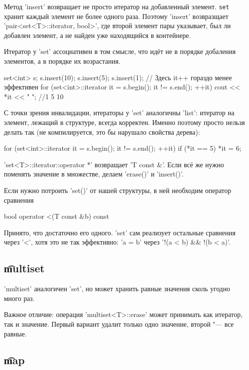 Метод \cpp'insert' возвращает не просто итератор на добавленный элемент.
\verb'set' хранит каждый элемент не более одного раза.
Поэтому \cpp'insert' возвразщает \cpp'pair<set<T>::iterator, bool>', где второй элемент пары указывает, 
был ли добавлен элемент, а не найден уже находящийся в контейнере.

Итератор у \cpp'set' ассоциативен в том смысле, что идёт не в порядке добаления элементов, а в порядке их возрастания.
\begin{cppcode}
set<int> s;
s.insert(10);
s.insert(5);
s.insert(1);
// Здесь it++ гораздо менее эффективен
for (set<int>::iterator it = s.begin(); it != s.end(); ++it)
	cout << *it << " "; //1 5 10
\end{cppcode}

С точки зрения инвалидации, итераторы у \cpp'set' аналогичны \cpp'list': итератор на элемент, лежащий в структуре, всегда корректен.
Именно поэтому просто нельзя делать так (не компилируется, это бы нарушало свойства дерева):
\begin{cppcode}
for (set<int>::iterator it = s.begin(); it != s.end(); ++it)
	if (*it == 5)
		*it = 6;
\end{cppcode}
\cpp'set<T>::iterator::operator *' возвращает \cpp'T const &'.
Если всё же нужно поменять значение в множестве, делаем \cpp'erase()' и \cpp'insert()'.

Если нужно потроить \cpp'set()' от нашей структуры, в ней необходим оператор сравнения
\begin{cppcode}
bool operator <(T const &b) const
\end{cppcode}
Принято, что достаточно его одного. \cpp'set' сам реализует остальные сравнения через \cpp'<', хотя это не так эффективно:
\cpp'a = b' через \cpp'!(a < b) && !(b < a)'.

\subsection{\t{multiset}}

\cpp'multiset' аналогичен \cpp'set', но может хранить равные значения сколь угодно много раз.

Важное отличие: операция \cpp'multiset<T>::erase' может принимать как итератор, так и значение. Первый вариант удалит только одно значение, второй "--- все равные.

\subsection{\t{map}}


